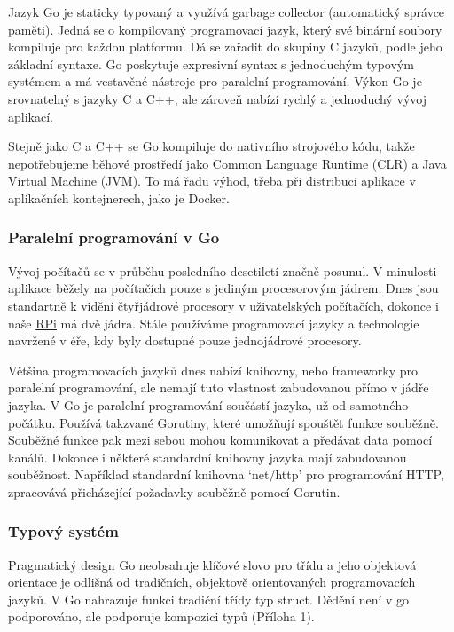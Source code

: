 \documentclass[czech,12pt,a4paper]{article}
\begin{document}
Jazyk Go je staticky typovaný a využívá garbage collector (automatický správce paměti). Jedná se o kompilovaný programovací jazyk, který své binární soubory kompiluje pro každou platformu. Dá se zařadit do skupiny C jazyků, podle jeho základní syntaxe. Go poskytuje expresivní syntax s jednoduchým typovým systémem a má vestavěné nástroje pro paralelní programování. Výkon Go je srovnatelný s jazyky C a C++, ale zároveň nabízí rychlý a jednoduchý vývoj aplikací.

Stejně jako C a C++ se Go kompiluje do nativního strojového kódu, takže
nepotřebujeme běhové prostředí jako Common Language Runtime (CLR) a Java Virtual Machine (JVM). To má řadu výhod, třeba při distribuci aplikace v aplikačních kontejnerech, jako je Docker.

\subsubsection{Paralelní programování v Go}

Vývoj počítačů se v průběhu posledního desetiletí značně posunul. V minulosti aplikace běžely na počítačích pouze s jediným procesorovým jádrem. Dnes jsou standartně k vidění čtyřjádrové procesory v uživatelských počítačích, dokonce i naše \underline{\ac{RPi}} má dvě jádra. Stále používáme programovací jazyky a technologie navržené v éře, kdy byly dostupné pouze jednojádrové procesory.

Většina programovacích jazyků dnes nabízí knihovny, nebo frameworky pro \linebreak paralelní programování, ale nemají tuto vlastnost zabudovanou přímo v jádře jazyka. V Go je paralelní programování součástí jazyka, už od samotného počátku. Používá takzvané Gorutiny, které umožňují spouštět funkce souběžně. Souběžné funkce pak mezi sebou mohou komunikovat a předávat data pomocí kanálů. Dokonce i některé standardní knihovny jazyka mají zabudovanou souběžnost. Například standardní knihovna `net/http' pro programování HTTP, zpracovává přicházející požadavky souběžně pomocí Gorutin.

\subsubsection{Typový systém}

Pragmatický design Go neobsahuje klíčové slovo pro třídu a jeho objektová orientace je odlišná od tradičních, objektově orientovaných programovacích jazyků. V Go nahrazuje funkci tradiční třídy typ struct. Dědění není v go podporováno, ale podporuje kompozici typů (Příloha 1).
\end{document}
